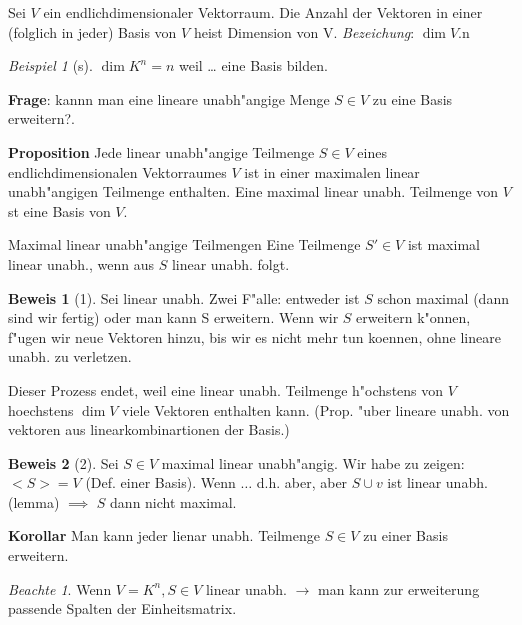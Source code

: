 \documentclass[11pt]{article}
\theoremstyle{remark}
\newtheorem{exa}{Beispiel}[section]
\newtheorem*{notte}{Beachte}
\theoremstyle{definition}
\newtheorem{prof}{Beweis}
\theoremstyle{remark}
\begin{document}
\begin{definition}{}{}
Sei \(V\) ein endlichdimensionaler Vektorraum. Die Anzahl der Vektoren in einer
(folglich in jeder) Basis von \(V\) heist Dimension von V. \emph{Bezeichung}: \(\dim V\).n
\end{definition}

\begin{exa}[s] \label{}
\(\dim K^{n}=n\) weil \ldots{} eine Basis bilden. 
\end{exa}

\textbf{Frage}: kannn man eine lineare unabh"angige Menge \(S\in V\) zu eine Basis
erweitern?.

\textbf{Proposition} Jede linear unabh"angige Teilmenge \(S\in V\) eines
endlichdimensionalen Vektorraumes \(V\) ist in einer maximalen linear
unabh"angigen Teilmenge enthalten. Eine maximal linear unabh. Teilmenge von \(V\)
st eine Basis von \(V\).

\begin{definition}{Maximal linear unabh"angige Teilmengen}{}
Eine Teilmenge \(S'\in V\) ist maximal linear unabh., wenn aus \(S\)
linear unabh. folgt.
\end{definition}

\begin{prof}[1] \label{}
Sei linear unabh.
Zwei F"alle: entweder ist \(S\) schon maximal (dann sind wir fertig) oder man kann
S erweitern. Wenn wir \(S\) erweitern k"onnen, f"ugen wir neue Vektoren hinzu, bis
wir es nicht mehr tun koennen, ohne lineare unabh. zu verletzen.

Dieser Prozess endet, weil eine linear unabh. Teilmenge h"ochstens von \(V\)
hoechstens \(\dim V\) viele Vektoren enthalten kann. (Prop. "uber lineare unabh.
von vektoren aus linearkombinartionen der Basis.)
\end{prof}

\begin{prof}[2] \label{}
Sei \(S\in V\) maximal linear unabh"angig. Wir habe zu zeigen: \(<S>=V\) (Def. einer
Basis). Wenn $\ldots{}$ d.h. aber, aber \(S\cup {v}\) ist linear unabh. (lemma) $\implies$
\(S\) dann nicht maximal.
\end{prof}

\textbf{Korollar} Man kann jeder lienar unabh. Teilmenge \(S\in V\) zu einer Basis
erweitern.

\begin{notte}
Wenn \(V=K^n, S\in V\) linear unabh. \(\rightarrow\) man kann zur erweiterung passende
Spalten der Einheitsmatrix.
\end{notte}
\end{document}
